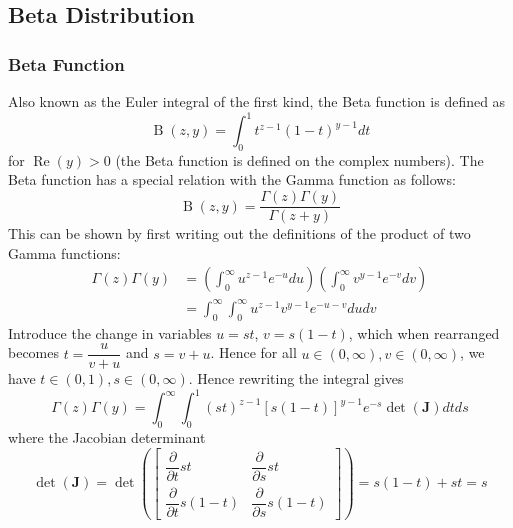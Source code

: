 \documentclass[11pt]{report} %
\begin{document}
\subsection{Beta Distribution}

\subsubsection{Beta Function}

Also known as the Euler integral of the first kind, the Beta function is defined as
\begin{equation}
\operatorname{B}\left(z, y\right) = \int_{0}^{1}t^{z - 1}\left(1 - t\right)^{y - 1}dt
\end{equation}
for $\operatorname{Re}\left(y\right) > 0$ (the Beta function is defined on the complex numbers). The Beta function has a special relation with the Gamma function as follows:
\begin{equation}
\operatorname{B}\left(z, y\right) = \dfrac{\Gamma\left(z\right)\Gamma\left(y\right)}{\Gamma\left(z + y\right)}
\end{equation}
This can be shown by first writing out the definitions of the product of two Gamma functions:
\begin{align}
\Gamma\left(z\right)\Gamma\left(y\right) &= \left(\int_{0}^{\infty}u^{z - 1}e^{-u}du\right)\left(\int_{0}^{\infty}v^{y - 1}e^{-v}dv\right) \\
&= \int_{0}^{\infty}\int_{0}^{\infty}u^{z - 1}v^{y - 1}e^{-u - v}dudv
\end{align}
Introduce the change in variables $u = st$, $v = s\left(1 - t\right)$, which when rearranged becomes $t = \dfrac{u}{v + u}$ and $s = v + u$. Hence for all $u \in \left(0, \infty\right), v \in \left(0, \infty\right)$, we have $t \in\left(0, 1\right), s \in\left(0, \infty\right)$. Hence rewriting the integral gives
\begin{equation}
\Gamma\left(z\right)\Gamma\left(y\right)  = \int_{0}^{\infty}\int_{0}^{1}\left(st\right)^{z - 1}\left[s\left(1 - t\right)\right]^{y - 1}e^{-s}\det\left(\mathbf{J}\right)dtds
\end{equation}
where the Jacobian determinant
\begin{equation}
\det\left(\mathbf{J}\right) = \det\left(\begin{bmatrix}\dfrac{\partial}{\partial t}st & \dfrac{\partial}{\partial s}st\\
\dfrac{\partial}{\partial t}s\left(1-t\right) & \dfrac{\partial}{\partial s}s\left(1-t\right)
\end{bmatrix}\right) = s\left(1 - t\right) + st = s
\end{equation}
\end{document}
